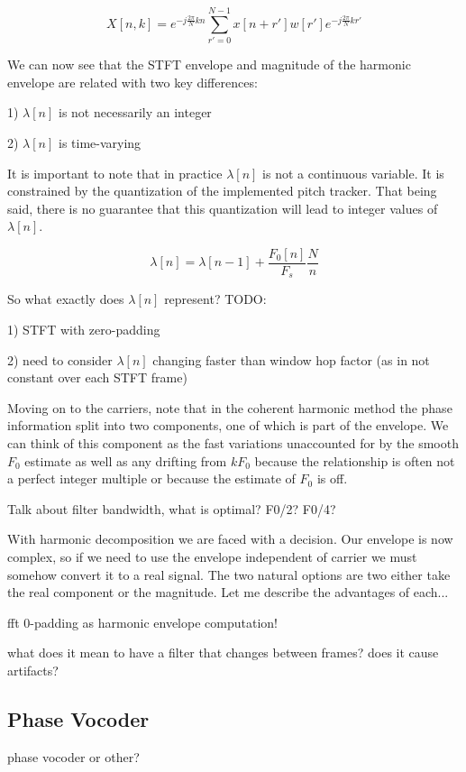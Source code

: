 \documentclass [11pt, proquest] {uwthesis}[2015/03/03]
\begin{document}
$$X[n,k] = e^{-j\frac{2\pi}{N}kn} \sum\limits_{r'=0}^{N-1} x[n + r'] w[r'] e^{-j\frac{2\pi}{N}kr'}$$


We can now see that the STFT envelope and magnitude of the harmonic envelope are related with two key differences:

1) $\lambda[n]$ is not necessarily an integer

2) $\lambda[n]$ is time-varying

It is important to note that in practice $\lambda[n]$ is not a continuous variable.  It is constrained by the quantization of the implemented pitch tracker.  That being said, there is no guarantee that this quantization will lead to integer values of $\lambda[n]$.

$$\lambda[n] = \lambda[n-1] + \frac{F_0[n]}{F_s}  \frac{N}{n}$$

So what exactly does $\lambda[n]$ represent?  TODO: 

1) STFT with zero-padding

2) need to consider $\lambda[n]$ changing faster than window hop factor (as in not constant over each STFT frame)

Moving on to the carriers, note that in the coherent harmonic method the phase information split into two components, one of which is part of the envelope.  We can think of this component as the fast variations unaccounted for by the smooth $F_0$ estimate as well as any drifting from $kF_0$ because the relationship is often not a perfect integer multiple or because the estimate of $F_0$ is off.



Talk about filter bandwidth, what is optimal? F0/2? F0/4?


With harmonic decomposition we are faced with a decision.  Our envelope is now complex, so if we need to use the envelope independent of carrier we must somehow convert it to a real signal.  The two natural options are two either take the real component or the magnitude.  Let me describe the advantages of each...


fft 0-padding as harmonic envelope computation!

		what does it mean to have a filter that changes
		between frames?  does it cause artifacts?


\subsection{Phase Vocoder}

phase vocoder or other?
\end{document}
